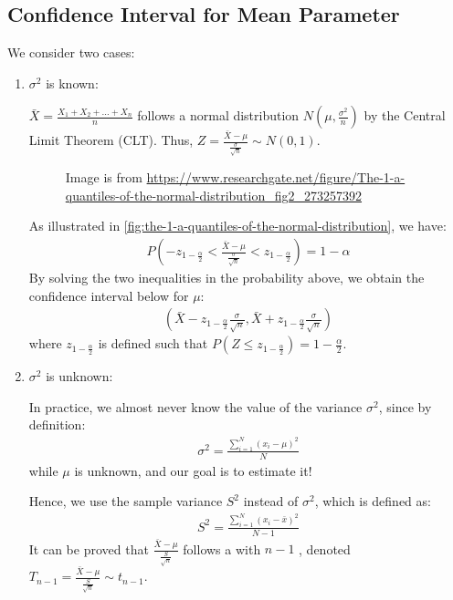 \subsection{Confidence Interval for Mean Parameter}

We consider two cases:
\begin{enumerate}
    \item \( \sigma^2 \) is known:
    
    \( \bar{X} = \frac{X_1 + X_2 + \ldots + X_n}{n} \) follows a normal distribution \( N(\mu, \frac{\sigma^2}{n}) \) by the Central Limit Theorem (CLT).
    Thus, \( Z = \frac{\bar{X} - \mu}{\frac{\sigma}{\sqrt{n}}} \sim N(0, 1) \).
    \begin{figure}[t]
    \begin{center}
    \end{center}
    \caption{Image is from \url{https://www.researchgate.net/figure/The-1-a-quantiles-of-the-normal-distribution_fig2_273257392}}
    \label{fig:the-1-a-quantiles-of-the-normal-distribution}
    \end{figure}
    As illustrated in \autoref{fig:the-1-a-quantiles-of-the-normal-distribution}, we have:
    \begin{gather*}
        P(-z_{1 - \frac{\alpha}{2}} < \frac{\bar{X} - \mu}{\frac{\sigma}{\sqrt{n}}} < z_{1 - \frac{\alpha}{2}}) = 1 - \alpha
    \end{gather*}
    By solving the two inequalities in the probability above, we obtain the confidence interval below for \( \mu \):
    \begin{gather*}
        (\bar{X} - z_{1 - \frac{\alpha}{2}}\frac{\sigma}{\sqrt{n}}, \bar{X} + z_{1 - \frac{\alpha}{2}}\frac{\sigma}{\sqrt{n}})
    \end{gather*}
    where \( z_{1 - \frac{\alpha}{2}} \) is defined such that \( P(Z \leq z_{1 - \frac{\alpha}{2}}) = 1 - \frac{\alpha}{2} \).
    \item \( \sigma^2 \) is unknown:
    
    In practice, we almost never know the value of the variance \( \sigma^2 \), since by definition:
    \begin{gather*}
        \sigma^2 = \frac{\sum_{i = 1}^{N}(x_i - \mu)^2}{N}
    \end{gather*}
    while \( \mu \) is unknown, and our goal is to estimate it!

    Hence, we use the sample variance \( S^2 \) instead of \( \sigma^2 \), which is defined as:
    \begin{gather*}
        S^2 = \frac{\sum_{i = 1}^{N}(x_i - \bar{x})^2}{N - 1}
    \end{gather*}
    It can be proved that \( \frac{\bar{X} - \mu}{\frac{S}{\sqrt{n}}} \) follows a  with \( n - 1 \) ,
    denoted \( T_{n - 1} = \frac{\bar{X} - \mu}{\frac{S}{\sqrt{n}}} \sim t_{n - 1} \).


\end{enumerate}
